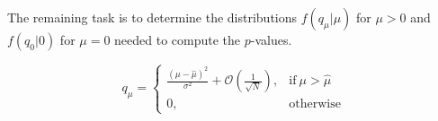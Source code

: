 The remaining task is to determine the distributions $f\left(q_{\mu} \rvert \mu\right)$ for $\mu>0$ and $f\left(q_{0} \rvert 0\right)$ 
for $\mu=0$ needed to compute the $p$-values. 



\begin{equation}
  q_{\mu} =
  \begin{cases}
    \frac{\left(\mu - \hat{\mu}\right)^2}{\sigma^2} + \mathcal{O}\left(\frac{1}{\sqrt{N}}\right)
    , & \text{if}\ \mu > \hat{\mu} \\
    0, & \text{otherwise}
  \end{cases}
\end{equation}

